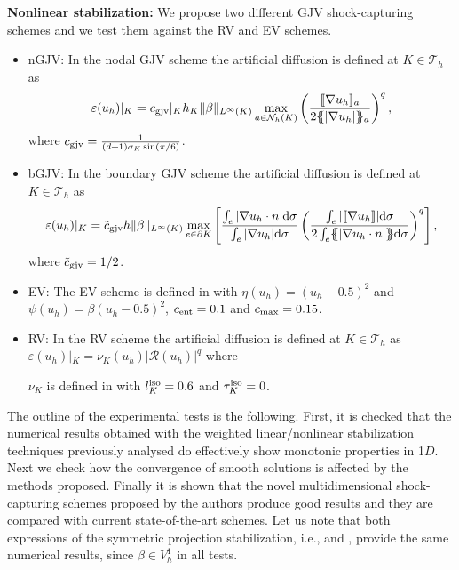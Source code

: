 \begin{algorithm}[Hhtbp]
{\bf Nonlinear stabilization:} We propose two different GJV shock-capturing schemes and we test them against the RV and EV schemes.
\setlength{\leftmargini}{0pt}
\begin{itemize}
\item nGJV: In the nodal GJV scheme the artificial diffusion is defined at $K \in \mathcal{T}_h$ as
\begin{align*}%
\varepsilon(u_h)|_K = c_{\rm gjv}|_K h_K \|\beta\|_{L^\infty(K)} \max_{a \in \mathcal{N}_h(K)}\left(\frac{ \jump{\nabla u_h}_a }{2\mean{|\nabla u_h|}_a}\right)^q,
\end{align*}
where $c_{\rm gjv} = \frac{1}{(d+1) \sigma_K \sin (\pi/6)}$. %
\item bGJV: In the boundary GJV scheme the artificial diffusion is defined at $K \in \mathcal{T}_h$ as
\begin{align*}%
\varepsilon(u_h)|_K = \tilde c_{\rm gjv} h \|\beta\|_{L^\infty(K)} \max_{e \in \partial K}\left[\frac{\int_e |\nabla u_h \cdot n|{\rm d} \sigma}{\int_e |\nabla u_h| {\rm d} \sigma}\left(\frac{\int_e  | \jump{\nabla u_h}|{\rm d} \sigma }{ 2 \int_e \mean{|\nabla u_h \cdot n|} {\rm d} \sigma}\right)^q\right],
\end{align*}
where $\tilde c_{\rm gjv} = 1/2$.
\item EV: The EV scheme is defined in  with $\eta(u_h) = (u_h-0.5)^2$ and $\psi(u_h) = \beta(u_h-0.5)^2$, $c_{\rm ent} = 0.1$ and $c_{\rm max}=0.15$. 
\item RV: In the RV  scheme the artificial diffusion is defined at $K \in \mathcal{T}_h$ as $\varepsilon(u_h)|_K = \nu_K(u_h) |\mathcal{R}(u_h)|^q$ where

 $\nu_K$ is defined in  with $l_K^{\rm iso}=0.6$ and $\tau_K^{\rm iso}=0$.
\end{itemize}
\caption{Possible combination of linear stabilization and shock-capturing\label{alg-wNPS-GJV}}
\end{algorithm}

The outline of the experimental tests is the following. First, it is checked that the numerical results obtained with the weighted linear/nonlinear stabilization techniques previously analysed do effectively show monotonic properties in 1$D$. Next we check how the convergence of smooth solutions is affected by the methods proposed.  Finally it is shown that the novel multidimensional shock-capturing schemes proposed by the authors produce good results and they are compared with current state-of-the-art schemes. Let us note that both expressions of the symmetric projection stabilization, i.e.,  and , provide the same numerical results, since $\beta  \in V_h^1$ in all tests.

